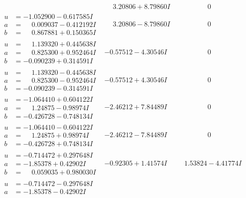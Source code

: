 \documentclass[1p]{elsarticle_modified}
\theoremstyle{definition}
\begin{document}
$$\begin{array}{c|c|c}
 & \phantom{-}3.20806 + 8.79860 I & \phantom{-0.000000 } 0 \\ \hline\begin{aligned}
u &= -1.052900 - 0.617585 I \\
a &= \phantom{-}0.009037 - 0.412192 I \\
b &= \phantom{-}0.867881 + 0.150365 I\end{aligned}
 & \phantom{-}3.20806 - 8.79860 I & \phantom{-0.000000 } 0 \\ \hline\begin{aligned}
u &= \phantom{-}1.139320 + 0.445638 I \\
a &= \phantom{-}0.825300 + 0.952464 I \\
b &= -0.090239 + 0.314591 I\end{aligned}
 & -0.57512 - 4.30546 I & \phantom{-0.000000 } 0 \\ \hline\begin{aligned}
u &= \phantom{-}1.139320 - 0.445638 I \\
a &= \phantom{-}0.825300 - 0.952464 I \\
b &= -0.090239 - 0.314591 I\end{aligned}
 & -0.57512 + 4.30546 I & \phantom{-0.000000 } 0 \\ \hline\begin{aligned}
u &= -1.064410 + 0.604122 I \\
a &= \phantom{-}1.24875 - 0.98974 I \\
b &= -0.426728 - 0.748134 I\end{aligned}
 & -2.46212 + 7.84489 I & \phantom{-0.000000 } 0 \\ \hline\begin{aligned}
u &= -1.064410 - 0.604122 I \\
a &= \phantom{-}1.24875 + 0.98974 I \\
b &= -0.426728 + 0.748134 I\end{aligned}
 & -2.46212 - 7.84489 I & \phantom{-0.000000 } 0 \\ \hline\begin{aligned}
u &= -0.714472 + 0.297648 I \\
a &= -1.85378 + 0.42902 I \\
b &= \phantom{-}0.059035 + 0.980030 I\end{aligned}
 & -0.92305 + 1.41574 I & \phantom{-}1.53824 - 4.41774 I \\ \hline\begin{aligned}
u &= -0.714472 - 0.297648 I \\
a &= -1.85378 - 0.42902 I \\

\end{aligned}
\end{array}$$
\end{document}
